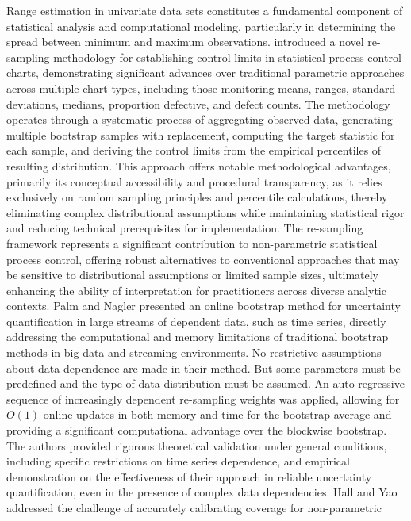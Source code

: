 \documentclass[a4paper,fleqn]{cas-dc}
\begin{document}
Range estimation in univariate data sets constitutes a fundamental component of statistical analysis and 
computational modeling, particularly in determining the spread between minimum and maximum observations. 
\cite{wood} introduced a novel re-sampling methodology for establishing control limits in statistical 
process control charts, demonstrating significant advances over traditional parametric approaches across 
multiple chart types, including those monitoring means, ranges, standard deviations, medians, 
proportion defective, and defect counts. The methodology operates through a systematic process of 
aggregating observed data, generating multiple bootstrap samples with replacement, computing the 
target statistic for each sample, and deriving the control limits from the empirical percentiles of 
resulting distribution. This approach offers notable methodological advantages, primarily its conceptual 
accessibility and procedural transparency, as it relies exclusively on random sampling principles and 
percentile calculations, thereby eliminating complex distributional assumptions while maintaining 
statistical rigor and reducing technical prerequisites for implementation. The re-sampling framework 
represents a significant contribution to non-parametric statistical process control, offering robust 
alternatives to conventional approaches that may be sensitive to distributional assumptions or limited 
sample sizes, ultimately enhancing the ability of interpretation for practitioners across diverse 
analytic contexts. Palm and Nagler \cite{palm} presented an online bootstrap method for uncertainty 
quantification in large streams of dependent data, such as time series, directly addressing the 
computational and memory limitations of traditional bootstrap methods in big data and streaming 
environments. No restrictive assumptions about data dependence are made in their method. But some
parameters must be predefined and the type of data distribution must be assumed. 
An auto-regressive sequence of increasingly dependent re-sampling weights was applied, 
allowing for $O(1)$ online updates in both memory and time for the bootstrap average and providing a 
significant computational advantage over the blockwise bootstrap. The authors provided rigorous 
theoretical validation under general conditions, including specific restrictions on time series dependence, 
and empirical demonstration on the effectiveness of their approach in 
reliable uncertainty quantification, even in the presence of complex data dependencies. 
Hall and Yao \cite{hall} addressed the challenge of accurately calibrating coverage for non-parametric 
\end{document}

